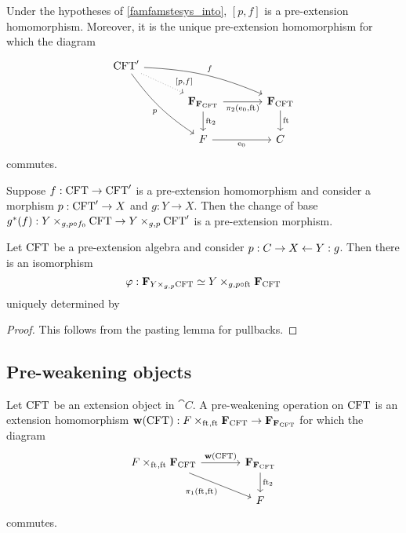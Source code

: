 \begin{lem}
Under the hypotheses of \autoref{famfamstesys_into}, $[p,f]$ is a pre-extension
homomorphism. Moreover, it is the unique pre-extension homomorphism for which
the diagram
\begin{equation*}
\begin{tikzcd}[column sep=large]
\stesys' 
  \ar[bend left=10]{rrd}{f}
  \ar[swap,bend right=10]{ddr}{p}
  \ar[dotted]{dr}[near end]{[p,f]}
  \\
  {}&
\famesys{\famesys{\stesys}}
  \ar{r}[swap]{\pullbackpr{2}{\ectxext}{\eft}}
  \ar{d}{\eft[2]}
  &
\famesys{\stesys}
  \ar{d}{\eft}
  \\
  {}&
\stesysf
  \ar{r}[swap]{\ectxext}
  &
\stesysc
\end{tikzcd}
\end{equation*}
commutes.
\end{lem}

\begin{lem}
Suppose $f:\mathrm{CFT}\to \mathrm{CFT}'$ is a pre-extension homomorphism and consider a morphism
$p:\mathrm{CFT}'\to X$ and $g:Y\to X$. Then the change of base 
$g^\ast(f):\cobesys{Y}{\stesys}{g}{p\circ f_0}\to
\cobesys{Y}{\stesys'}{g}{p}$ is a pre-extension morphism.
\end{lem}

\begin{lem}
Let $\mathrm{CFT}$ be a pre-extension algebra and consider $p:C\rightarrow X\leftarrow Y:g$.
Then there is an isomorphism
\begin{equation*}
\varphi:\famesys{\cobesys{Y}{\stesys}{g}{p}}
  \simeq
\cobesys{Y}{\famesys{\stesys}}{g}{p\circ\eft}
\end{equation*}
uniquely determined by
\end{lem}

\begin{proof}
This follows from the pasting lemma for pullbacks.
\end{proof}

\subsection{Pre-weakening objects}
\begin{defn}
Let $\mathrm{CFT}$ be an extension object in $\cat{C}$. A pre-weakening operation
on $\mathrm{CFT}$ is an extension homomorphism 
$ \mathbf{w}(\stesys)
    :
  \cobesys{\stesysf}{\famesys{\stesys}}{\eft}{\eft}
    \to
  \famesys{\famesys{\stesys}}$
for which the diagram
\begin{equation*}
\begin{tikzcd}[column sep=large]
\cobesys{\stesysf}{\famesys{\stesys}}{\eft}{\eft}
  \ar{r}{\mathbf{w}(\stesys)}
  \ar{dr}[swap]{\pullbackpr{1}{\eft}{\eft}}
  &
\famesys{\famesys{\stesys}}
  \ar{d}{\eft[2]}
  \\
& \stesysf
\end{tikzcd}
\end{equation*}
commutes.
\end{defn}

